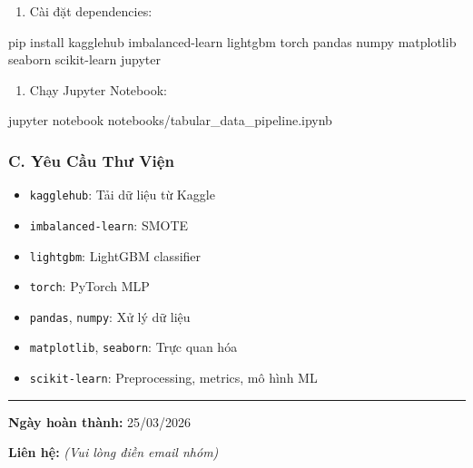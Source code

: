 \documentclass[
]{article}
\newenvironment{Shaded}{}{}
\newcommand{\ExtensionTok}[1]{#1}
\newcommand{\NormalTok}[1]{#1}
\providecommand{\tightlist}{%
  \setlength{\itemsep}{0pt}\setlength{\parskip}{0pt}}
\begin{document}
\begin{enumerate}
\def\labelenumi{\arabic{enumi}.}
\setcounter{enumi}{1}
\tightlist
\item
  Cài đặt dependencies:
\end{enumerate}

\begin{Shaded}
\begin{Highlighting}[]
\ExtensionTok{pip}\NormalTok{ install kagglehub imbalanced{-}learn lightgbm torch pandas numpy matplotlib seaborn scikit{-}learn jupyter}
\end{Highlighting}
\end{Shaded}

\begin{enumerate}
\def\labelenumi{\arabic{enumi}.}
\setcounter{enumi}{2}
\tightlist
\item
  Chạy Jupyter Notebook:
\end{enumerate}

\begin{Shaded}
\begin{Highlighting}[]
\ExtensionTok{jupyter}\NormalTok{ notebook notebooks/tabular\_data\_pipeline.ipynb}
\end{Highlighting}
\end{Shaded}

\subsubsection{C. Yêu Cầu Thư
Viện}\label{c-yuxeau-cux1ea7u-thux1b0-viux1ec7n}

\begin{itemize}
\tightlist
\item
  \texttt{kagglehub}: Tải dữ liệu từ Kaggle
\item
  \texttt{imbalanced-learn}: SMOTE
\item
  \texttt{lightgbm}: LightGBM classifier
\item
  \texttt{torch}: PyTorch MLP
\item
  \texttt{pandas}, \texttt{numpy}: Xử lý dữ liệu
\item
  \texttt{matplotlib}, \texttt{seaborn}: Trực quan hóa
\item
  \texttt{scikit-learn}: Preprocessing, metrics, mô hình ML
\end{itemize}

\begin{center}\rule{0.5\linewidth}{0.5pt}\end{center}

\textbf{Ngày hoàn thành:} 25/03/2026

\textbf{Liên hệ:} \emph{(Vui lòng điền email nhóm)}
\end{document}
